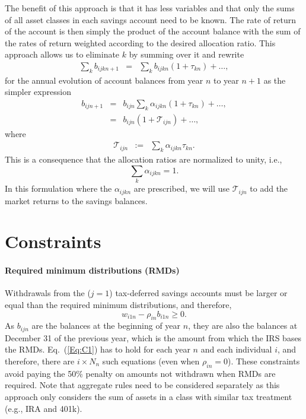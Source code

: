 \documentclass{report}[fleqn,11pt]
\begin{document}
The benefit of this approach is that it has less variables and that only the sums of
all asset classes in each savings account need to be known. The rate of return
of the account is then simply the product of the account balance with the sum of
the rates of return weighted according to the desired allocation ratio.
This approach allows us to eliminate $k$ by summing over it and rewrite
\begin{eqnarray}
	\sum_k b_{ijkn+1} &=& \sum_k b_{ijkn} (1 + \tau_{kn}) + \ldots ,
\end{eqnarray}
for the annual evolution of account balances from year $n$ to year $n+1$
as the simpler expression 
\begin{eqnarray}
	b_{ijn+1} &=& b_{ijn} \sum_k \alpha_{ijkn} (1 + \tau_{kn}) + \ldots ,\nonumber \\
		  &=& b_{ijn} (1 + \mathcal{T}_{ijn}) + \ldots ,
\end{eqnarray}
where
\begin{eqnarray}
	\label{Eq:Tau1}
	\mathcal{T}_{ijn} &:=& \sum_k \alpha_{ijkn} \tau_{kn}.
\end{eqnarray}
This is a consequence that the allocation ratios are normalized to unity, i.e.,
\begin{equation}
	\sum_k \alpha_{ijkn} = 1.
\end{equation}
In this formulation where the $\alpha_{ijkn}$ are prescribed,
we will use $\mathcal{T}_{ijn}$ to
add the market returns to the savings balances.

\section{Constraints}
\paragraph*{Required minimum distributions (RMDs)}
	Withdrawals from the ($j=1$) tax-deferred savings accounts must be larger
	or equal than the required minimum distributions, and therefore,
	\begin{equation}
		\label{Eq:C1}
		w_{i1n} -  \rho_{in}b_{i1n} \geq 0.
	\end{equation}
	As $b_{ijn}$ are the balances at the beginning of year $n$, they are also the balances
	at December 31 of the previous year, which is the amount from which the IRS bases the RMDs.
	Eq.~(\ref{Eq:C1}) has to hold for each year $n$ and each individual $i$, and therefore, there
	are $i\times N_n$ such equations (even when $\rho_{in} = 0$).
	These constraints avoid paying the 50\% penalty
	on amounts not withdrawn when RMDs are required.
	Note that aggregate rules need to be considered separately as this approach only considers
	the sum of assets in a class with similar tax treatment (e.g., IRA and 401k).
\end{document}
